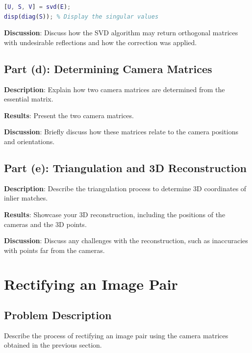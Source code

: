 \documentclass{article}
\begin{document}
\begin{lstlisting}[language=Matlab, caption={SVD Calculation of the Essential Matrix}, label={lst:svd}]
% Example code for SVD decomposition
[U, S, V] = svd(E);
disp(diag(S)); % Display the singular values
\end{lstlisting}

\textbf{Discussion}: Discuss how the SVD algorithm may return orthogonal matrices with undesirable reflections and how the correction was applied.

\subsection{Part (d): Determining Camera Matrices}
\textbf{Description}: Explain how two camera matrices are determined from the essential matrix.

\textbf{Results}: Present the two camera matrices.

\textbf{Discussion}: Briefly discuss how these matrices relate to the camera positions and orientations.

\subsection{Part (e): Triangulation and 3D Reconstruction}
\textbf{Description}: Describe the triangulation process to determine 3D coordinates of inlier matches.

\textbf{Results}: Showcase your 3D reconstruction, including the positions of the cameras and the 3D points.


\textbf{Discussion}: Discuss any challenges with the reconstruction, such as inaccuracies with points far from the cameras.

\section{Rectifying an Image Pair}

\subsection{Problem Description}
Describe the process of rectifying an image pair using the camera matrices obtained in the previous section.
\end{document}
